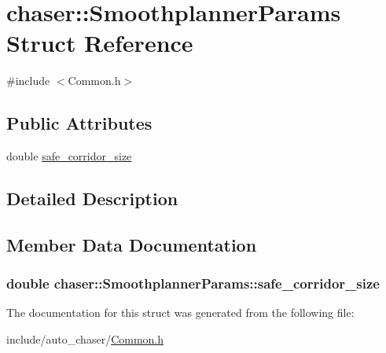 \hypertarget{structchaser_1_1_smoothplanner_params}{}\section{chaser\+:\+:Smoothplanner\+Params Struct Reference}
\label{structchaser_1_1_smoothplanner_params}


{\ttfamily \#include $<$Common.\+h$>$}

\subsection*{Public Attributes}
\begin{DoxyCompactItemize}
\item 
double \hyperlink{structchaser_1_1_smoothplanner_params_a9f04e119fe2f90c33a0bd94702b5950a}{safe\+\_\+corridor\+\_\+size}
\end{DoxyCompactItemize}


\subsection{Detailed Description}


\subsection{Member Data Documentation}
\subsubsection[{\texorpdfstring{safe\+\_\+corridor\+\_\+size}{safe_corridor_size}}]{\setlength{\rightskip}{0pt plus 5cm}double chaser\+::\+Smoothplanner\+Params\+::safe\+\_\+corridor\+\_\+size}\hypertarget{structchaser_1_1_smoothplanner_params_a9f04e119fe2f90c33a0bd94702b5950a}{}\label{structchaser_1_1_smoothplanner_params_a9f04e119fe2f90c33a0bd94702b5950a}


The documentation for this struct was generated from the following file\+:\begin{DoxyCompactItemize}
\item 
include/auto\+\_\+chaser/\hyperlink{_common_8h}{Common.\+h}\end{DoxyCompactItemize}
